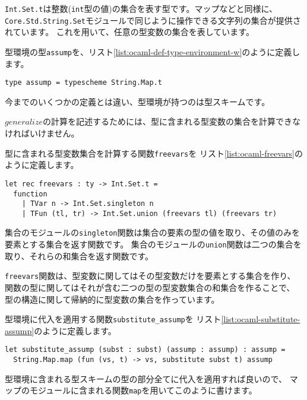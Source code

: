 \texttt{Int.Set.t}は整数(\texttt{int}型の値)の集合を表す型です。マップなどと同様に、
\texttt{Core.Std.String.Set}モジュールで同じように操作できる文字列の集合が提供されています。
これを用いて、任意の型変数の集合を表しています。

型環境の型\texttt{assump}を、リスト\ref{list:ocaml-def-type-environment-w}のように定義します。

\begin{lstlisting}[caption=型環境の定義, label=list:ocaml-def-type-environment-w]
type assump = typescheme String.Map.t
\end{lstlisting}

今までのいくつかの定義とは違い、型環境が持つのは型スキームです。

$\mathit{generalize}$の計算を記述するためには、型に含まれる型変数の集合を計算できなければいけません。

型に含まれる型変数集合を計算する関数\texttt{freevars}を
リスト\ref{list:ocaml-freevars}のように定義します。

\begin{lstlisting}[caption=型に含まれる型変数集合の計算, label=list:ocaml-freevars]
let rec freevars : ty -> Int.Set.t =
  function
    | TVar n -> Int.Set.singleton n
    | TFun (tl, tr) -> Int.Set.union (freevars tl) (freevars tr)
\end{lstlisting}

集合のモジュールの\texttt{singleton}関数は集合の要素の型の値を取り、その値のみを要素とする集合を返す関数です。
集合のモジュールの\texttt{union}関数は二つの集合を取り、それらの和集合を返す関数です。

\texttt{freevars}関数は、型変数に関してはその型変数だけを要素とする集合を作り、
関数の型に関してはそれが含む二つの型の型変数集合の和集合を作ることで、
型の構造に関して帰納的に型変数の集合を作っています。

型環境に代入を適用する関数\texttt{substitute\_assump}を
リスト\ref{list:ocaml-substitute-assump}のように定義します。

\begin{lstlisting}[caption=型環境に代入を適用, label=list:ocaml-substitute-assump]
let substitute_assump (subst : subst) (assump : assump) : assump =
  String.Map.map (fun (vs, t) -> vs, substitute subst t) assump
\end{lstlisting}

型環境に含まれる型スキームの型の部分全てに代入を適用すれば良いので、
マップのモジュールに含まれる関数\texttt{map}を用いてこのように書けます。

